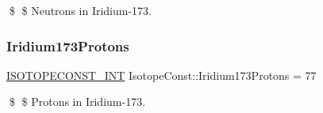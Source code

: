 \$ \$ Neutrons in Iridium-\/173. \mbox{\label{group___isotope_const-_iridium-_ir173_gab588789ccf7366695c6838b060069ec0}} 
\subsubsection{\texorpdfstring{Iridium173\+Protons}{Iridium173Protons}}
{\footnotesize\ttfamily \mbox{\hyperlink{group___isotope_const-_macros_ga5f18360b3e99483a35c32d789e62621c}{I\+S\+O\+T\+O\+P\+E\+C\+O\+N\+S\+T\+\_\+\+I\+NT}} Isotope\+Const\+::\+Iridium173\+Protons = 77}

\$ \$ Protons in Iridium-\/173. 